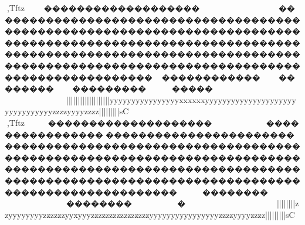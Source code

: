 {{{{{{{{{{{{{{{{{{{{{{{{{{{{{{{{{{{{{{{{{{{{{{{{{{{{{{{{{{{{{{{{{{{{{{{{{{{{{{{{{{{{{{{{{{{{{{{{{{{{{{{{{{{{{{{{{{{{{{{{{{{{{{{{{{{{{{{{{{{{{{{{{{{{{{{{{{{{{{{{{{{{{{{{{{{{{{{{{{{{{{{{{{{{{{{{{{{{{{{{{{{{{{{{{{{{{{{{{{{{{{{{{{{{{{{{{{{{{{{{{{{{{{{{{{{{{{{{{{{{{{{{{{{{{{{{{{{{{{{{{{{{{{{{{{{{{{{{{{{{{{{{{{{{{{{{{{{{{{{{{{{{{{{{{{{{{{{{{{{{{{{{{{{{{{{{{{{{{{{{{{{{{{{{{{{{{{{{{{{{{{{{{{{{{{{{{{{{{{{{{{{{{{{{{{{{{{{{{{{{{{{{{{{{{{{{{{{{{{{{{{{{{{{{{{{{{{{{{{{{{{{{{{{{{{{{{{{{{{{{{{{{{{{{{{{{{{{{{{{{{{{{{{{{{{{{{{{{{{{{{{{{{{{{{{{{{{{{{{{{{{{{{{{{{{{{{{{{{{{{{{{{{{{{{{{{{{{{{{{{{{{{{{{{{{{{{{{{{{{{{{{{{{{{{{{{{{{{{{{{{{{{{{{{{{{{{{{{{{{{{{{{{{{{{{{{{{{{{{{{{{{{{{{{{{{{{{{{{{{{{{{{{{{{{{{{{{{{{{{{{{{{{{{{{{{{{{{{{{{{{{{{{{{{{{{{{{{{{{{{{{{{{{{{{{{{{{{{{{{{{{{{{{{{{{{{{{{{{{{{{{{{{{{{{{{{{{{{{{{{{{{{{{{{{{{{{{{{{{{{{{{{{{{{{{{{{{{{{{{{{{{{{{{{{{{{{{{{{{{{{{{{{{{{{{{{{{{{{{{{{{{{{{{{{{{{{{{{{{{{{{{{{{{{{{{{{{{{{{{{{{{{{{{{{{{{{{{{{{{{{{{{{{{{{{{{{{{{{{{{{{{{{{{{{{{{{{{{{{{{{{{{{{{{{{{{{{{{{{{{{{{{{{{{{{{{{{{{{{{{{{{{{{{{{{{{{{{{{{{{{{{{{{{{{{{{{{{{{{{{{{{{{{{{{{{{{{{{{{{{{{{,Tftz~~~�������������������~~~~~~~~�������������������������������������������������������������������������������������������������������������������������������������������������������������������������������������������������������������������������������������~~~~�����~~~~~~~~~~~~~~~~~~~~~~~~~~~}}}}}}|||||||||||||||||||{yyyyyyyyyyyyyyyyxxxxxxyyyyyyyyyyyyyyyyyyyyyyyyyyyyyyyyzzzzyyyyzzzz{{{{|||||||||sC
,Tftz~~~~��������������������~~~~~~~��������������������������������������������������������������������������������������������������������������������������������������������������������������������������������������������������������������������~��������~~~~~~�~~~~~~~~~~~~~~~~~~~~}}}}}}|||||}}}}|||{{{{{{{{zzyyyyyyyyzzzzzzyyxyyyzzzzzzzzzzzzzzzzyyyyyyyyyyyyyyyyzzzzyyyyzzzz{{{{|||||||||sC
}}}}}}}}}}}}}}}}}}}}}}}}}}}}}}}}}}}}}}}}}}}}}}}}}}}}}}}}}}}}}}}}}}}}}}}}}}}}}}}}}}}}}}}}}}}}}}}}}}}}}}}}}}}}}}}}}}}}}}}}}}}}}}}}}}}}}}}}}}}}}}}}}}}}}}}}}}}}}}}}}}}}}}}}}}}}}}}}}}}}}}}}}}}}}}}}}}}}}}}}}}}}}}}}}}}}}}}}}}}}}}}}}}}}}}}}}}}}}}}}}}}}}}}}}}}}}}}}}}}}}}}}}}}}}}}}}}}}}}}}}}}}}}}}}}}}}}}}}}}}}}}}}}}}}}}}}}}}}}}}}}}}}}}}}}}}}}}}}}}}}}}}}}}}}}}}}}}}}}}}}}}}}}}}}}}}}}}}}}}}}}}}}}}}}}}}}}}}}}}}}}}}}}}}}}}}}}}}}}}}}}}}}}}}}}}}}}}}}}}}}}}}}}}}}}}}}}}}}}}}}}}}}}}}}}}}}}}}}}}}}}}}}}}}}}}}}}}}}}}}}}}}}}}}}}}}}}}}}}}}}}}}}}}}}}}}}}}}}}}}}}}}}}}}}}}}}}}}}}}}}}}}}}}}}}}}}}}}}}}}}}}}}}}}}}}}}}}}}}}}}}}}}}}}}}}}}}}}}}}}}}}}}}}}}}}}}}}}}}}}}}}}}}}}}}}}}}}}}}}}}}}}}}}}}}}}}}}}}}}}}}}}}}}}}}}}}}}}}}}}}}}}}}}}}}}}}}}}}}}}}}}}}}}}}}}}}}}}}}}}}}}}}}}}}}}}}}}}}}}}}}}}}}}}}}}}}}}}}}}}}}}}}}}}}}}}}}}}}}}}}}}}}}}}}}}}}}}}}}}}}}}}}}}}}}}}}}}}}}}}}}}}}}}}}}}}}}}}}}}}}}}}}}}}}}}}}}}}}}}}}}}}}}}}}}}}}}}}}}}}}}}}}}}}}}}}}}}}}}}}}}}}}}}}}}}}}}}}}}}}}}}}}}}}}}}}}}}}}}}}}}}}}}}}}}}}}}}}}}}}}}}}}}}}}}}}}}}}}}}}}}}}}}}}}}}}}}}}}}}}}}}}}}}}}}}}}}}}}}}}}}}}}}}}}}}}}}}}}}}}}}}}}}}}}}}}}}}}}}}}}}}}
